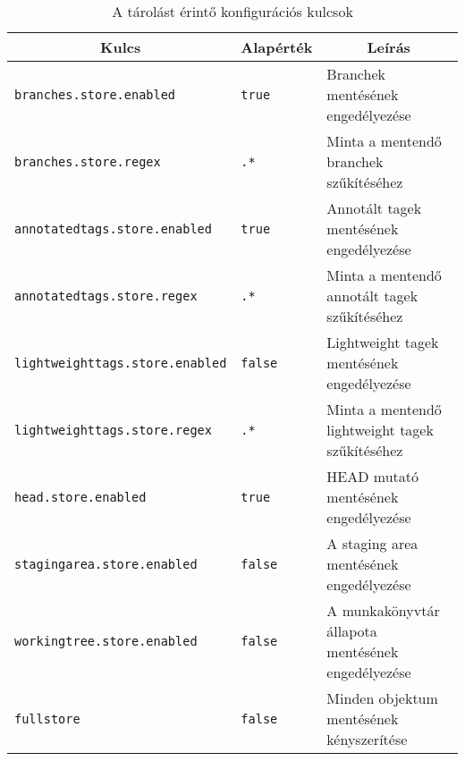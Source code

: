 \documentclass[
]{elteikthesis}[2025/03/25]
\begin{document}
\begin{table}[h]
\captionsetup{justification=justified, singlelinecheck=false}
\begin{center}
\begin{tabular}{|l|l|p{5cm}|} 
 \hline
 \multicolumn{1}{|c}{\textbf{Kulcs}} &
 \multicolumn{1}{|c}{\textbf{Alapérték}} &
 \multicolumn{1}{|c|}{\textbf{Leírás}} \\
 \hline\hline
 
 \texttt{branches.store.enabled} & \texttt{true} & Branchek mentésének engedélyezése\vspace{0.5em} \\
 \texttt{branches.store.regex} & \texttt{.*} & Minta a mentendő branchek szűkítéséhez\vspace{0.5em} \\
 \texttt{annotatedtags.store.enabled} & \texttt{true} & Annotált tagek mentésének engedélyezése\vspace{0.5em} \\
 \texttt{annotatedtags.store.regex} & \texttt{.*} & Minta a mentendő annotált tagek szűkítéséhez\vspace{0.5em} \\
 \texttt{lightweighttags.store.enabled} & \texttt{false} & Lightweight tagek mentésének engedélyezése\vspace{0.5em} \\
 \texttt{lightweighttags.store.regex} & \texttt{.*} & Minta a mentendő lightweight tagek szűkítéséhez\vspace{0.5em} \\
 \texttt{head.store.enabled} & \texttt{true} & HEAD mutató mentésének engedélyezése\vspace{0.5em} \\
 \texttt{stagingarea.store.enabled} & \texttt{false} & A staging area mentésének engedélyezése\vspace{0.5em} \\
 \texttt{workingtree.store.enabled} & \texttt{false} & A munkakönyvtár állapota mentésének engedélyezése\vspace{0.5em} \\
 \texttt{fullstore} & \texttt{false} & Minden objektum mentésének kényszerítése \\
 
 \hline

\end{tabular}
\end{center}
\caption{A tárolást érintő konfigurációs kulcsok}
\label{tab:store-config-keys}
\end{table}
\end{document}
